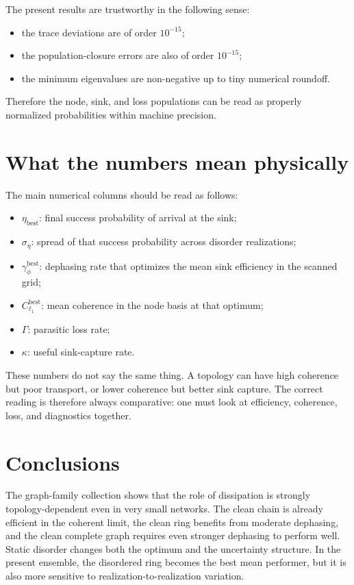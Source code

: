 \documentclass[11pt,a4paper]{article}
\begin{document}
The present results are trustworthy in the following sense:
\begin{itemize}
  \item the trace deviations are of order $10^{-15}$;
  \item the population-closure errors are also of order $10^{-15}$;
  \item the minimum eigenvalues are non-negative up to tiny numerical roundoff.
\end{itemize}

Therefore the node, sink, and loss populations can be read as properly normalized probabilities within machine precision.

\section{What the numbers mean physically}

The main numerical columns should be read as follows:
\begin{itemize}
  \item $\eta_{\mathrm{best}}$: final success probability of arrival at the sink;
  \item $\sigma_\eta$: spread of that success probability across disorder realizations;
  \item $\gamma_\phi^{\mathrm{best}}$: dephasing rate that optimizes the mean sink efficiency in the scanned grid;
  \item $C_{\ell_1}^{\mathrm{best}}$: mean coherence in the node basis at that optimum;
  \item $\Gamma$: parasitic loss rate;
  \item $\kappa$: useful sink-capture rate.
\end{itemize}

These numbers do not say the same thing. A topology can have high coherence but
poor transport, or lower coherence but better sink capture. The correct reading
is therefore always comparative: one must look at efficiency, coherence, loss,
and diagnostics together.

\section{Conclusions}

The graph-family collection shows that the role of dissipation is strongly
topology-dependent even in very small networks. The clean chain is already
efficient in the coherent limit, the clean ring benefits from moderate
dephasing, and the clean complete graph requires even stronger dephasing to
perform well. Static disorder changes both the optimum and the uncertainty
structure. In the present ensemble, the disordered ring becomes the best mean
performer, but it is also more sensitive to realization-to-realization variation.
\end{document}
